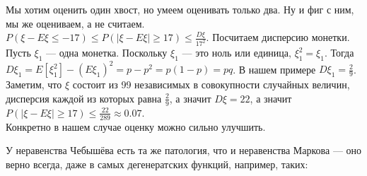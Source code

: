 \documentclass{article}
\begin{document}
\begin{itemize}
\begin{Example}
\begin{center}
            \end{center}
            Мы хотим оценить один хвост, но умеем оценивать только два. Ну и фиг с ним, мы же оцениваем, а не считаем.\\
            $P(\xi-E\xi\leqslant-17)\leqslant P(|\xi-E\xi|\geqslant17)\leqslant\frac{D\xi}{17^2}$. Посчитаем дисперсию монетки. Пусть $\xi_1$ --- одна монетка. Поскольку $\xi_1$ --- это ноль или единица, $\xi_1^2=\xi_1$. Тогда $D\xi_1=E[\xi_1^2]-(E\xi_1)^2=p-p^2=p(1-p)=pq$. В нашем примере $D\xi_1=\frac29$. Заметим, что $\xi$ состоит из 99 независимых в совокупности случайных величин, дисперсия каждой из которых равна $\frac29$, а значит $D\xi=22$, а значит $P(|\xi-E\xi|\geqslant17)\leqslant\frac{22}{289}\approx0.07$.\\
            Конкретно в нашем случае оценку можно сильно улучшить.
        \end{Example}
        \begin{Comment}
            У неравенства Чебышёва есть та же патология, что и неравенства Маркова --- оно верно всегда, даже в самых дегенератских функций, например, таких:
            \begin{center}
            \end{center}

\end{Comment}
\end{itemize}
\end{document}
